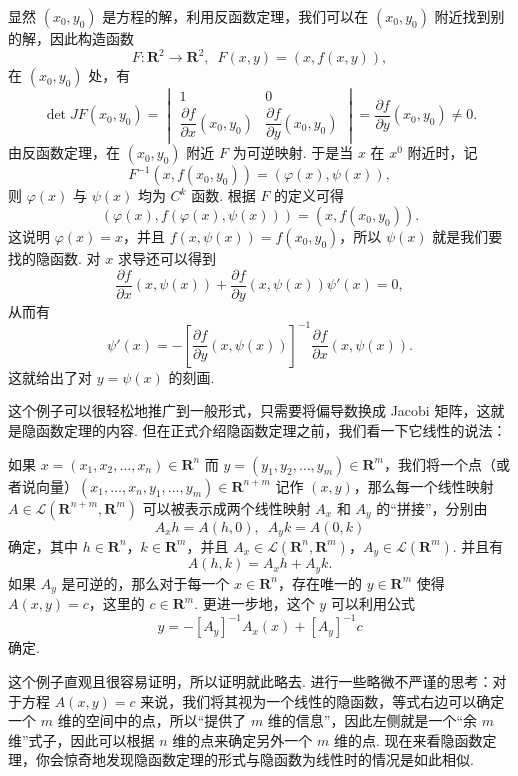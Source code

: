\begin{solution}
    显然 $(x_0, y_0)$ 是方程的解，利用反函数定理，我们可以在 $(x_0, y_0)$ 附近找到别的解，因此构造函数\[F\colon \mathbf{R}^2\to \mathbf{R}^2,\enspace F(x, y) = (x, f(x, y)),\]
    在 $(x_0, y_0)$ 处，有 \[\det JF(x_0, y_0) = \begin{vmatrix}
            1                                        & 0                                        \\[1ex]
            \dfrac{\partial f}{\partial x}(x_0, y_0) & \dfrac{\partial f}{\partial y}(x_0, y_0)
        \end{vmatrix} = \dfrac{\partial f}{\partial y}(x_0, y_0)\neq 0.\]
    由反函数定理，在 $(x_0, y_0)$ 附近 $F$ 为可逆映射. 于是当 $x$ 在 $x^0$ 附近时，记 \[F^{-1}(x, f(x_0, y_0)) = (\varphi(x), \psi(x)),\]
    则 $\varphi(x)$ 与 $\psi(x)$ 均为 $C^k$ 函数. 根据 $F$ 的定义可得 \[(\varphi(x), f(\varphi(x), \psi(x))) = (x, f(x_0, y_0)).\]
    这说明 $\varphi(x) = x$，并且 $f(x, \psi(x)) = f(x_0, y_0)$，所以 $\psi(x)$ 就是我们要找的隐函数. 对 $x$ 求导还可以得到 \[\frac{\partial f}{\partial x}(x, \psi(x)) + \frac{\partial f}{\partial y}(x, \psi(x))\psi'(x) = 0,\]
    从而有 \[\psi'(x) = -[\frac{\partial f}{\partial y}(x, \psi(x))]^{-1}\frac{\partial f}{\partial x}(x, \psi(x)).\]
    这就给出了对 $y = \psi(x)$ 的刻画.
\end{solution}

这个例子可以很轻松地推广到一般形式，只需要将偏导数换成 Jacobi 矩阵，这就是隐函数定理的内容. 但在正式介绍隐函数定理之前，我们看一下它线性的说法：

\begin{example}{}{}
    如果 $x = (x_1, x_2, \ldots, x_n)\in\mathbf{R}^n$ 而 $y = (y_1, y_2, \ldots, y_m)\in\mathbf{R}^m$，我们将一个点（或者说向量）$(x_1, \ldots, x_n, y_1, \ldots, y_m)\in \mathbf{R}^{n+m}$ 记作 $(x, y)$，那么每一个线性映射 $A\in \mathcal{L}(\mathbf{R}^{n+m}, \mathbf{R}^{m})$ 可以被表示成两个线性映射 $A_x$ 和 $A_y$ 的``拼接''，分别由 \[A_xh = A(h, 0),\enspace A_yk = A(0, k)\]
    确定，其中 $h\in\mathbf{R}^n$，$k\in\mathbf{R}^m$，并且 $A_x\in \mathcal{L}(\mathbf{R}^n, \mathbf{R}^m)$，$A_y\in \mathcal{L}(\mathbf{R}^m)$. 并且有 \[A(h, k) = A_xh + A_yk.\]
    如果 $A_y$ 是可逆的，那么对于每一个 $x\in\mathbf{R}^n$，存在唯一的 $y\in\mathbf{R}^m$ 使得 $A(x, y) = c$，这里的 $c\in\mathbf{R}^m$. 更进一步地，这个 $y$ 可以利用公式 \[y = -[A_y]^{-1}A_x(x) + [A_y]^{-1}c\] 确定.
\end{example}

这个例子直观且很容易证明，所以证明就此略去. 进行一些略微不严谨的思考：对于方程 $A(x, y) = c$ 来说，我们将其视为一个线性的隐函数，等式右边可以确定一个 $m$ 维的空间中的点，所以``提供了 $m$ 维的信息''，因此左侧就是一个``余 $m$ 维''式子，因此可以根据 $n$ 维的点来确定另外一个 $m$ 维的点. 现在来看隐函数定理，你会惊奇地发现隐函数定理的形式与隐函数为线性时的情况是如此相似.


